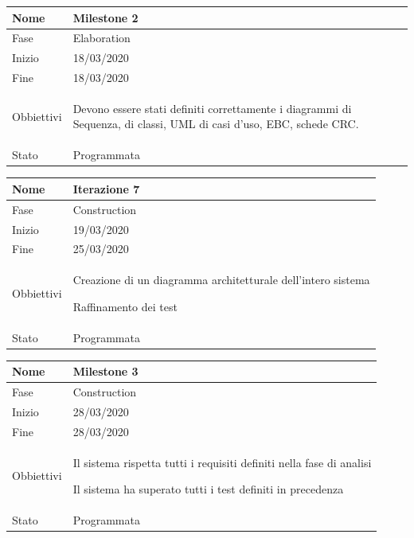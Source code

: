 \begin{center}
\begin{tabular}{ |p{2cm}|p{10cm}|  }
\hline
Nome & Milestone 2\\\hline
Fase & Elaboration \\\hline
Inizio & 18/03/2020 \\\hline
Fine &  18/03/2020 \\\hline
Obbiettivi & 
	\begin{compactitem}
		\item Devono essere stati definiti correttamente i diagrammi di Sequenza, di classi, UML di casi d'uso, EBC, schede CRC.
	\end{compactitem}\\\hline
Stato &  Programmata \\\hline
\end{tabular}
\label{table:milestone2}\newline

\begin{tabular}{ |p{2cm}|p{10cm}|  }
\hline
Nome & Iterazione 7 \\\hline
Fase & Construction \\\hline
Inizio & 19/03/2020 \\\hline
Fine &  25/03/2020  \\\hline
Obbiettivi & 
	\begin{compactitem}
		\item Creazione di un diagramma architetturale dell'intero sistema
		\item Raffinamento dei test
	\end{compactitem}\\\hline
Stato &  Programmata \\\hline
\end{tabular}
\label{table:7}\newline

\begin{tabular}{ |p{2cm}|p{10cm}|  }
\hline
Nome & Milestone 3\\\hline
Fase & Construction \\\hline
Inizio & 28/03/2020 \\\hline
Fine &  28/03/2020 \\\hline
Obbiettivi & 
	\begin{compactitem}
		\item Il sistema rispetta tutti i requisiti definiti nella fase di analisi
		\item Il sistema ha superato tutti i test definiti in precedenza
	\end{compactitem}\\\hline
Stato &  Programmata \\\hline
\end{tabular}
\label{table:milestone3}\newline


\end{center}
